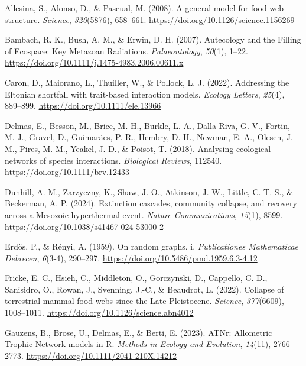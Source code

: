 \documentclass[
]{article}
\newlength{\cslhangindent}
\newenvironment{CSLReferences}[2] %
 {\begin{list}{}{%
  \setlength{\itemindent}{0pt}
  \setlength{\leftmargin}{0pt}
  \setlength{\parsep}{0pt}
  \ifodd #1
   \setlength{\leftmargin}{\cslhangindent}
   \setlength{\itemindent}{-1\cslhangindent}
  \fi
  \setlength{\itemsep}{#2\baselineskip}}}
 {\end{list}}
\begin{document}
\label{refs}
\begin{CSLReferences}{1}{0}
Allesina, S., Alonso, D., \& Pascual, M. (2008). A general model for
food web structure. \emph{Science}, \emph{320}(5876), 658--661.
\url{https://doi.org/10.1126/science.1156269}

Bambach, R. K., Bush, A. M., \& Erwin, D. H. (2007). Autecology and the
Filling of Ecospace: Key Metazoan Radiations. \emph{Palaeontology},
\emph{50}(1), 1--22.
\url{https://doi.org/10.1111/j.1475-4983.2006.00611.x}

Caron, D., Maiorano, L., Thuiller, W., \& Pollock, L. J. (2022).
Addressing the Eltonian shortfall with trait-based interaction models.
\emph{Ecology Letters}, \emph{25}(4), 889--899.
\url{https://doi.org/10.1111/ele.13966}

Delmas, E., Besson, M., Brice, M.-H., Burkle, L. A., Dalla Riva, G. V.,
Fortin, M.-J., Gravel, D., Guimarães, P. R., Hembry, D. H., Newman, E.
A., Olesen, J. M., Pires, M. M., Yeakel, J. D., \& Poisot, T. (2018).
Analysing ecological networks of species interactions. \emph{Biological
Reviews}, 112540. \url{https://doi.org/10.1111/brv.12433}

Dunhill, A. M., Zarzyczny, K., Shaw, J. O., Atkinson, J. W., Little, C.
T. S., \& Beckerman, A. P. (2024). Extinction cascades, community
collapse, and recovery across a Mesozoic hyperthermal event.
\emph{Nature Communications}, \emph{15}(1), 8599.
\url{https://doi.org/10.1038/s41467-024-53000-2}

Erdős, P., \& Rényi, A. (1959). On random graphs. i. \emph{Publicationes
Mathematicae Debrecen}, \emph{6}(3-4), 290--297.
\url{https://doi.org/10.5486/pmd.1959.6.3-4.12}

Fricke, E. C., Hsieh, C., Middleton, O., Gorczynski, D., Cappello, C.
D., Sanisidro, O., Rowan, J., Svenning, J.-C., \& Beaudrot, L. (2022).
Collapse of terrestrial mammal food webs since the Late Pleistocene.
\emph{Science}, \emph{377}(6609), 1008--1011.
\url{https://doi.org/10.1126/science.abn4012}

Gauzens, B., Brose, U., Delmas, E., \& Berti, E. (2023). ATNr:
Allometric Trophic Network models in R. \emph{Methods in Ecology and
Evolution}, \emph{14}(11), 2766--2773.
\url{https://doi.org/10.1111/2041-210X.14212}


\end{CSLReferences}
\end{document}
